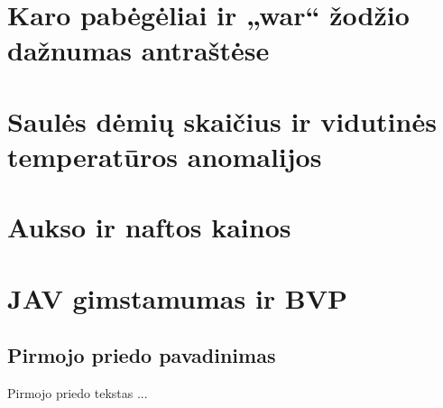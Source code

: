 \documentclass[a4paper,12pt,fleqn]{article}
\begin{document}
    {}{}{}{}%
    {}

    \tableofcontents

    


    \newpage
    \section{Karo pabėgėliai ir „war“ žodžio dažnumas antraštėse}
    \label{sec:refugees}
    

    \section{Saulės dėmių skaičius ir vidutinės temperatūros anomalijos}
    \label{sec:sunspots}
    

    \section{Aukso ir naftos kainos}
    \label{sec:oil-gold}
    

    \section{JAV gimstamumas ir BVP}
    \label{sec:gdp-births}
    



    





    \newpage
    \begin{appendices}
        \section{Pirmojo priedo pavadinimas}
        \label{app:a}
        Pirmojo priedo tekstas ...

    \end{appendices}
\end{document}
